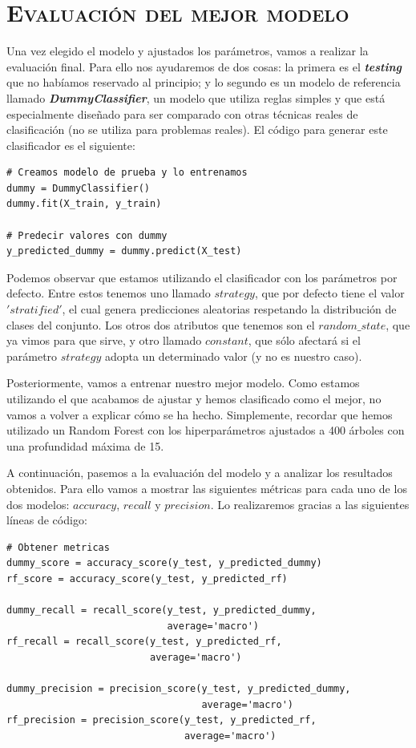 \documentclass[11pt,a4paper]{article}
\begin{document}
\section{\textsc{Evaluación del mejor modelo}}

Una vez elegido el modelo y ajustados los parámetros, vamos a realizar la evaluación final. Para ello nos ayudaremos de dos cosas: la primera es el \textbf{\textit{testing}} que no habíamos reservado al principio; y lo segundo es un modelo de referencia llamado \textbf{\textit{DummyClassifier}}\cite{DummyClassifier}, un modelo que utiliza reglas simples y que está especialmente diseñado para ser comparado con otras técnicas reales de clasificación (no se utiliza para problemas reales). El código para generar este clasificador es el siguiente:

\begin{lstlisting}
# Creamos modelo de prueba y lo entrenamos
dummy = DummyClassifier()
dummy.fit(X_train, y_train)

# Predecir valores con dummy
y_predicted_dummy = dummy.predict(X_test)
\end{lstlisting}

Podemos observar que estamos utilizando el clasificador con los parámetros por defecto. Entre estos tenemos uno llamado $strategy$, que por defecto tiene el valor $'stratified'$, el cual genera predicciones aleatorias respetando la distribución de clases del conjunto. Los otros dos atributos que tenemos son el $random\_state$, que ya vimos para que sirve, y otro llamado $constant$, que sólo afectará si el parámetro $strategy$ adopta un determinado valor (y no es nuestro caso).

Posteriormente, vamos a entrenar nuestro mejor modelo. Como estamos utilizando el que acabamos de ajustar y hemos clasificado como el mejor, no vamos a volver a explicar cómo se ha hecho. Simplemente, recordar que hemos utilizado un Random Forest con los hiperparámetros ajustados a 400 árboles con una profundidad máxima de 15.

A continuación, pasemos a la evaluación del modelo y a analizar los resultados obtenidos. Para ello vamos a mostrar las siguientes métricas para cada uno de los dos modelos: $accuracy$, $recall$ y $precision$. Lo realizaremos gracias a las siguientes líneas de código:

\begin{lstlisting}
# Obtener metricas
dummy_score = accuracy_score(y_test, y_predicted_dummy)
rf_score = accuracy_score(y_test, y_predicted_rf)

dummy_recall = recall_score(y_test, y_predicted_dummy,
                            average='macro')
rf_recall = recall_score(y_test, y_predicted_rf,
                         average='macro')

dummy_precision = precision_score(y_test, y_predicted_dummy,
                                  average='macro')
rf_precision = precision_score(y_test, y_predicted_rf,
                               average='macro')
\end{lstlisting}
\end{document}
